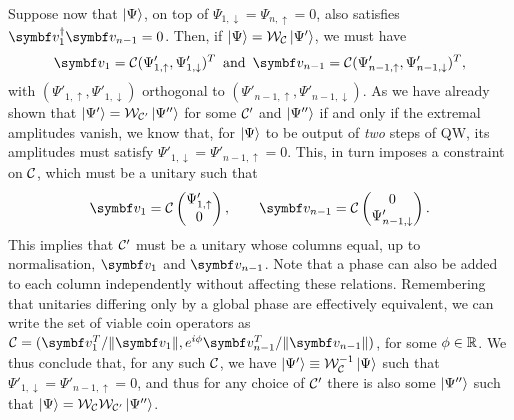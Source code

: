 Suppose now that $\ket\Psi$, on top of $\Psi_{1,\downarrow}=\Psi_{n,\uparrow}=0$, also satisfies $\bs v_1^\dagger \bs v_{n-1}=0$. Then, if $\ket\Psi={\mathcal{W}}_{\mathcal{C}}\ket{\Psi'}$, we must have
\begin{equation}
    \bs v_1=\calC(\Psi'_{1,\uparrow},\Psi'_{1,\downarrow})^T
    \,\text{ and }\,
    \bs v_{n-1}=\calC(\Psi'_{n-1,\uparrow},\Psi'_{n-1,\downarrow})^T,
\end{equation}
with $(\Psi'_{1,\uparrow},\Psi'_{1,\downarrow})$ orthogonal to
$(\Psi'_{n-1,\uparrow},\Psi'_{n-1,\downarrow})$.
As we have already shown that $\ket{\Psi'}={\mathcal{W}}_{{\mathcal{C}}'}\ket{\Psi''}$ for some ${\mathcal{C}}'$ and $\ket{\Psi''}$ if and only if the extremal amplitudes vanish, we know that, for $\ket\Psi$ to be output of \emph{two} steps of QW, its amplitudes must satisfy
$\Psi'_{1,\downarrow}=\Psi'_{n-1,\uparrow}=0$. This, in turn imposes a constraint on ${\mathcal{C}}$, which must be a unitary such that
\begin{equation}
    \bs v_1 = \calC \begin{pmatrix}
        \Psi'_{1,\uparrow} \\ 0
    \end{pmatrix}, \qquad
    \bs v_{n-1} = \calC \begin{pmatrix}
        0 \\ \Psi'_{n-1,\downarrow}
    \end{pmatrix}.
\end{equation}
This implies that ${\mathcal{C}}'$ must be a unitary whose columns equal, up to normalisation, $\bs v_1$ and $\bs v_{n-1}$. Note that a phase can also be added to each column independently without affecting these relations. Remembering that unitaries differing only by a global phase are effectively equivalent, we can write the set of viable coin operators as
$\calC = (\bs v_1^T/\|\bs v_1\|, e^{i\phi}\bs v_{n-1}^T/\|\bs v_{n-1}\|)$,
for some $\phi\in{\mathbb{R}}$.
We thus conclude that, for any such ${\mathcal{C}}$, we have $\ket{\Psi'}\equiv{\mathcal{W}}_{{\mathcal{C}}}^{-1}\ket\Psi$ such that $\Psi'_{1,\downarrow}=\Psi'_{n-1,\uparrow}=0$, and thus for any choice of ${\mathcal{C}}'$ there is also some $\ket{\Psi''}$ such that $\ket\Psi={\mathcal{W}}_{\mathcal{C}}{\mathcal{W}}_{{\mathcal{C}}'}\ket{\Psi''}$.

